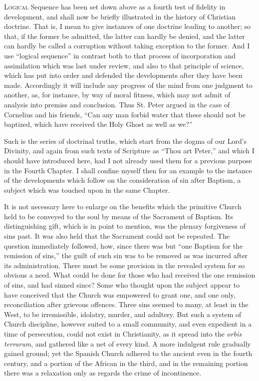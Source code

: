 L\textsc{ogical} Sequence has been set down above as a fourth test of
fidelity in development, and shall now be briefly illustrated in the
history of Christian doctrine. That is, I mean to give instances of
one doctrine leading to another; so that, if the former be admitted,
the latter can hardly be denied, and the latter can hardly be called a
corruption without taking exception to the former. And I use
``logical sequence'' in contrast both to that process of
incorporation and assimilation which was last under review, and also
to that principle of science, which has put into order and defended
the developments after they have been made. Accordingly it will
include any progress of the mind from one judgment to another, as, for
instance, by way of moral fitness, which may not admit of analysis
into premiss and conclusion. Thus St. Peter argued in the case of
Cornelius and his friends, ``Can any man forbid water that these
should not be baptized, which have received the Holy Ghost as well as
we?''

Such is the series of doctrinal truths, which start from the dogma
of our Lord's Divinity, and again from such texts of Scripture as
``Thou art Peter,'' and which I should have introduced here,
had I not already used them for a previous purpose in the Fourth
Chapter. I shall confine myself then for an example to the instance of
the developments which follow on the consideration of sin after
Baptism, a subject which was touched upon in the same Chapter.


It is not necessary here to enlarge on the benefits which the
primitive Church held to be conveyed to the soul by means of the
Sacrament of Baptism. Its distinguishing gift, which is in point to
mention, was the plenary forgiveness of sins past. It was also held
that the Sacrament could not be repeated. The question immediately
followed, how, since there was but ``one Baptism for the remission
of sins,'' the guilt of such sin was to be removed as was incurred
after its administration. There must be some provision in the revealed
system for so obvious a need. What could be done for those who had
received the one remission of sins, and had sinned since? Some who
thought upon the subject appear to have conceived that the Church was
empowered to grant one, and one only, reconciliation after grievous
offences. Three sins seemed to many, at least in the West, to be
irremissible, idolatry, murder, and adultery. But such a system of
Church discipline, however suited to a small community, and even
expedient in a time of persecution, could not exist in Christianity,
as it spread into the \emph{orbis terrarum}, and gathered like a net
of every kind. A more indulgent rule gradually gained ground; yet the
Spanish Church adhered to the ancient even in the fourth century, and
a portion of the African in the third, and in the remaining portion
there was a relaxation only as regards the crime of incontinence.

